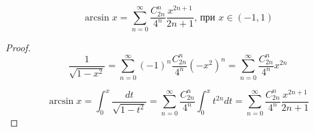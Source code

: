 \begin{theorem}  \thmslashn
    
     \[\arcsin x = \sum_{n=0}^{\infty} \frac{C_{2n}^{n}}{4^{n}}\frac{x^{2n + 1}}{2n + 1} \text{, при } x \in (-1, 1)\]
    
    \begin{proof} \thmslashn
        \[\frac{1}{\sqrt{1-x^{2}}} =  \sum_{n=0}^{\infty} (-1)^{n}\frac{C_{2n}^{n}}{4^{n}}(-x^{2})^{n} = \sum_{n=0}^{\infty} \frac{C_{2n}^{n}}{4^{n}}x^{2n}\]
        
        
        \[\arcsin x = \int_{0}^{x}\frac{dt}{\sqrt{1-t^{2}}} = \sum_{n=0}^{\infty} \frac{C_{2n}^{n}}{4^{n}}\int_{0}^{x}t^{2n}dt = \sum_{n=0}^{\infty} \frac{C_{2n}^{n}}{4^{n}}\frac{x^{2n + 1}}{2n + 1}\]
    \end{proof}
    
\end{theorem}
